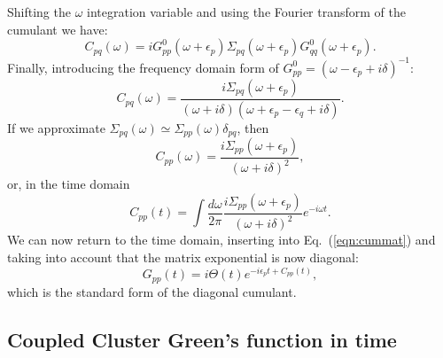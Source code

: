 \documentclass[aps,prb,preprint,groupaddress,floatfix]{revtex4}
\begin{document}
Shifting the $\omega$ integration variable and using the Fourier transform of
the cumulant we have:
\begin{equation}
C_{pq}(\omega) = i G^0_{pp}(\omega+\epsilon_p)
\Sigma_{pq}(\omega+\epsilon_p) G^0_{qq}(\omega+\epsilon_p).
\end{equation}
Finally, introducing the frequency domain form of
$G^0_{pp}=(\omega-\epsilon_p+i\delta)^{-1}$:
\begin{equation}
\label{eqn:cumfreq}
C_{pq}(\omega) = \frac{i \Sigma_{pq}(\omega+\epsilon_p)}
{(\omega+i\delta)(\omega+\epsilon_p-\epsilon_q+i\delta)}.
\end{equation}
If we approximate $\Sigma_{pq}(\omega) \simeq \Sigma_{pp}(\omega) \delta_{pq}$,
then
\begin{equation}
\label{eqn:cum_diag}
C_{pp}(\omega) = \frac{i \Sigma_{pp}(\omega+\epsilon_p)}
{(\omega+i\delta)^2},
\end{equation}
or, in the time domain
\begin{equation}
\label{eqn:cum_diag_t}
C_{pp}(t) = \int \frac{d\omega}{2\pi} \frac{i\Sigma_{pp}(\omega+\epsilon_p)}
{(\omega+i\delta)^2} e^{-i\omega t}.
\end{equation}
We can now return to the time domain, inserting into Eq.\ (\ref{eqn:cummat}) and
taking into account that the matrix exponential is now diagonal:
\begin{equation}
\label{eqn:g_cum_diag}
G_{pp}(t) = i \Theta(t) e^{-i \epsilon_p t + C_{pp}(t)},
\end{equation}
which is the standard form of the diagonal cumulant.

\subsection{Coupled Cluster Green's function in time}
\label{sec:ccg_t}
\end{document}
